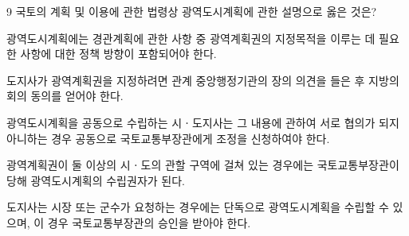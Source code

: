 \begin{question}{9}
국토의 계획 및 이용에 관한 법령상 광역도시계획에 관한 설명으로 옳은 것은?
\begin{choices}
  \item 광역도시계획에는 경관계획에 관한 사항 중 광역계획권의 지정목적을 이루는 데 필요한 사항에 대한 정책 방향이 포함되어야 한다.
  \item 도지사가 광역계획권을 지정하려면 관계 중앙행정기관의 장의 의견을 들은 후 지방의회의 동의를 얻어야 한다.
  \item 광역도시계획을 공동으로 수립하는 시ㆍ도지사는 그 내용에 관하여 서로 협의가 되지 아니하는 경우 공동으로 국토교통부장관에게 조정을 신청하여야 한다.
  \item 광역계획권이 둘 이상의 시ㆍ도의 관할 구역에 걸쳐 있는 경우에는 국토교통부장관이 당해 광역도시계획의 수립권자가 된다.
  \item 도지사는 시장 또는 군수가 요청하는 경우에는 단독으로 광역도시계획을 수립할 수 있으며, 이 경우 국토교통부장관의 승인을 받아야 한다.
\end{choices}
\end{question}
